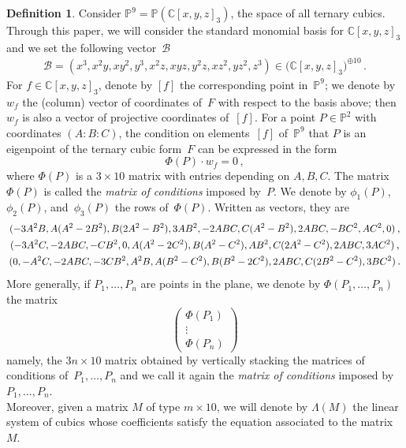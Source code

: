 \documentclass{amsart}
\theoremstyle{plain}
\theoremstyle{definition}
\newtheorem{definition}[lemma]{Definition}
\newcommand{\C}{\mathbb{C}}
\newcommand{\p}{\mathbb{P}}
\newcommand\scalemath[2]{\scalebox{#1}{\mbox{\ensuremath{\displaystyle #2}}}}
\begin{document}
\begin{definition}
\label{definition:matrix_conditions}
 Consider $\p^9 = \p(\C[x,y,z]_3)$, the space of all ternary cubics.
 Through this paper, we will consider the standard monomial basis for $\C[x,y,z]_3$ and we set the following vector~$\mathcal{B}$
 \begin{eqnarray}
  \mathcal{B} = (x^3, x^2 y, x y^2, y^3, x^2 z, x y z, y^2 z, x z^2, y z^2, z^3)
  \in \bigl( \C[x,y,z]_3 \bigr)^{\oplus 10} \,.
  \label{vector_basis}
 \end{eqnarray}
 For $f \in \C[x,y,z]_3$, denote by $[f]$ the corresponding point in~$\p^9$; we denote by $w_f$ the (column) vector of coordinates of~$F$ with respect to the basis above; then $w_f$ is also a vector of projective coordinates of~$[f]$.
 For a point $P \in \p^2$ with coordinates $(A: B: C)$, the condition on elements~$[f]$ of~$\p^9$ that $P$ is an eigenpoint of the ternary cubic form~$F$ can be expressed in the form
 \[
  \Phi(P) \cdot w_f
  = 0 \,,
 \]
 where $\Phi(P)$ is a $3 \times 10$ matrix with entries depending on $A, B, C$.
 The matrix $\Phi(P)$ is called the \emph{matrix of conditions} imposed by~$P$.
We denote by $\phi_1(P)$, $\phi_2(P)$, and~$\phi_3(P)$ the rows of~$\Phi(P)$.
Written as vectors, they are
%
\begin{equation}
\label{equation:matrix_conditions_rows}
\begin{gathered}
\scalemath{0.9}{(-3A^2B, A(A^2 - 2B^2), B(2A^2 - B^2), 3AB^2,
 -2ABC, C(A^2 - B^2), 2 ABC,
 -B  C^2, A  C^2, 0)} \,, \\
\scalemath{0.9}{(-3A^2 C,
-2ABC,
-CB^2,
0,
A(A^2-2C^2),
B(A^2 - C^2),
AB^2,
C(2A^2-C^2),
2ABC,
3AC^2)} \,,\\
\scalemath{0.9}{(0,
-A^2C,
-2ABC,
-3CB^2,
A^2 B,
A(B^2 - C^2),
B(B^2-2C^2),
2ABC,
C(2B^2-C^2),
3BC^2)} \,.
\end{gathered}
\end{equation}
%
More generally, if $P_1, \dotsc, P_n$ are points in the plane, we denote by $\Phi(P_1, \dotsc, P_n)$ the matrix
%
\[
 \left(
 \begin{array}{c}
  \Phi(P_1) \\
  \vdots \\
  \Phi(P_n)
 \end{array}
 \right)
\]
%
namely, the $3n \times 10$ matrix obtained by vertically stacking the
matrices of conditions of~$P_1, \dotsc, P_n$ and we call it again the
\emph{matrix of
conditions} imposed by $P_1, \dotsc, P_n$. \\
Moreover, given a matrix $M$ of type $m \times 10$, we will denote by
$\Lambda(M)$ the linear system of cubics whose coefficients
satisfy the equation associated to the matrix $M$.
\end{definition}
\end{document}
